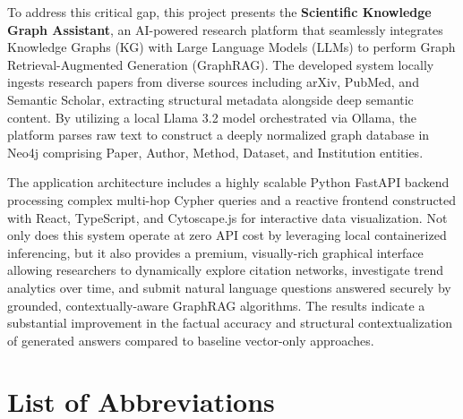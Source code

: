 \documentclass[12pt,a4paper]{report}
\begin{document}
To address this critical gap, this project presents the \textbf{Scientific Knowledge Graph Assistant}, an AI-powered research platform that seamlessly integrates Knowledge Graphs (KG) with Large Language Models (LLMs) to perform Graph Retrieval-Augmented Generation (GraphRAG). The developed system locally ingests research papers from diverse sources including arXiv, PubMed, and Semantic Scholar, extracting structural metadata alongside deep semantic content. By utilizing a local Llama 3.2 model orchestrated via Ollama, the platform parses raw text to construct a deeply normalized graph database in Neo4j comprising Paper, Author, Method, Dataset, and Institution entities. 

The application architecture includes a highly scalable Python FastAPI backend processing complex multi-hop Cypher queries and a reactive frontend constructed with React, TypeScript, and Cytoscape.js for interactive data visualization. Not only does this system operate at zero API cost by leveraging local containerized inferencing, but it also provides a premium, visually-rich graphical interface allowing researchers to dynamically explore citation networks, investigate trend analytics over time, and submit natural language questions answered securely by grounded, contextually-aware GraphRAG algorithms. The results indicate a substantial improvement in the factual accuracy and structural contextualization of generated answers compared to baseline vector-only approaches.
\clearpage

\tableofcontents
\listoffigures
{}

\listoftables
{}

\chapter*{List of Abbreviations}
\begin{acronym}[GraphRAG]
	\setlength{\itemsep}{-\parsep}
\end{acronym}
\end{document}
